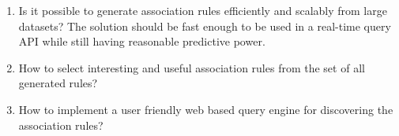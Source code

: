 \begin{enumerate}
	\item Is it possible to generate association rules efficiently and scalably from large datasets? The solution should be fast enough to be used in a real-time query API while still having reasonable predictive power. 
	
	\item How to select interesting and useful association rules from the set of all generated rules? 
	
	\item How to implement a user friendly web based query engine for discovering the association rules? 
\end{enumerate}  



